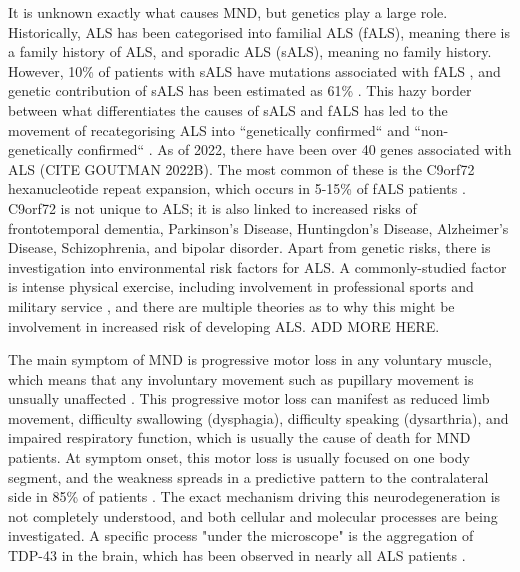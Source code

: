It is unknown exactly what causes MND, but genetics play a large role. Historically, ALS has been categorised into familial ALS (fALS), meaning there is a family history of ALS, and sporadic ALS (sALS), meaning no family history. However, 10\% of patients with sALS have mutations associated with fALS \cite{hanbyRiskRelativesPatients2011}, and genetic contribution of sALS has been estimated as 61\% \cite{al-chalabiEstimateAmyotrophicLateral2010}. This hazy border between what differentiates the causes of sALS and fALS has led to the movement of recategorising ALS into ``genetically confirmed`` and ``non-genetically confirmed`` \cite{feldmanAmyotrophicLateralSclerosis2022}.
As of 2022, there have been over 40 genes associated with ALS (CITE GOUTMAN 2022B). The most common of these is the C9orf72 hexanucleotide repeat expansion, which occurs in 5-15\% of fALS patients \cite{vanesAmyotrophicLateralSclerosis2017}. C9orf72 is not unique to ALS; it is also linked to increased risks of frontotemporal dementia, Parkinson's Disease, Huntingdon's Disease, Alzheimer's Disease, Schizophrenia, and bipolar disorder.
Apart from genetic risks, there is investigation into environmental risk factors for ALS. A commonly-studied factor is intense physical exercise, including involvement in professional sports and military service \cite{mckayMilitaryServiceRelated2021, lacortePhysicalActivityPhysical2016}, and there are multiple theories as to why this might be involvement in increased risk of developing ALS. ADD MORE HERE.

The main symptom of MND is progressive motor loss in any voluntary muscle, which means that any involuntary movement such as pupillary movement is unsually unaffected \cite{vanesAmyotrophicLateralSclerosis2017}. This progressive motor loss can manifest as reduced limb movement, difficulty swallowing (dysphagia), difficulty speaking (dysarthria), and impaired respiratory function, which is usually the cause of death for MND patients. At symptom onset, this motor loss is usually focused on one body segment, and the weakness spreads in a predictive pattern to the contralateral side in 85\% of patients \cite{walhoutPatternsSymptomDevelopment2018}. The exact mechanism driving this neurodegeneration is not completely understood, and both cellular and molecular processes are being investigated. A specific process "under the microscope" is the aggregation of TDP-43 in the brain, which has been observed in nearly all ALS patients \cite{blokhuisProteinAggregationAmyotrophic2013}.

